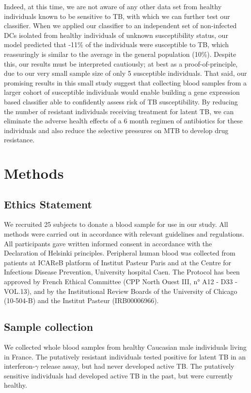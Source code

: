 \documentclass[fleqn,10pt]{wlscirep}
\begin{document}
Indeed, at this time, we are not aware of any other data set from
healthy individuals known to be sensitive to TB, with which we can
further test our classifier. When we applied our classifier to an
independent set of non-infected DCs isolated from healthy individuals
of unknown susceptibility status, our model predicted that
-11\% of the individuals were susceptible to TB, which
reassuringly is similar to the average in the general population
(10\%). Despite this, our results must be interpreted cautiously; at
best as a proof-of-principle, due to our very small sample size of
only 5 susceptible individuals. That said, our promising results in
this small study suggest that collecting blood samples from a larger
cohort of susceptible individuals would enable building a gene
expression based classifier able to confidently assess risk of TB
susceptibility. By reducing the number of resistant individuals
receiving treatment for latent TB, we can eliminate the adverse health
effects of a 6 month regimen of antibiotics for these individuals and
also reduce the selective pressures on MTB to develop drug resistance.
\section*{Methods}

\subsection*{Ethics Statement}

We recruited 25 subjects to donate a blood sample for use in our
study. All methods were carried out in accordance with relevant
guidelines and regulations. All participants gave written informed
consent in accordance with the Declaration of Helsinki principles.
Peripheral human blood was collected from patients at ICAReB platform
of Institut Pasteur Paris and at the Centre for Infectious Disease
Prevention, University hospital Caen. The Protocol has been approved
by French Ethical Committee (CPP North Ouest III, n° A12 - D33
-VOL.13), and by the Institutional Review Boards of the University of
Chicago (10-504-B) and the Institut Pasteur (IRB00006966).
\subsection*{Sample collection}

We collected whole blood samples from healthy Caucasian male
individuals living in France. The putatively resistant individuals
tested positive for latent TB in an interferon-$\gamma$ release assay,
but had never developed active TB. The putatively sensitive
individuals had developed active TB in the past, but were currently
healthy.
\end{document}
